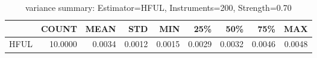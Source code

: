 \begin{table}[ht]
\centering
\caption{variance summary: Estimator=HFUL, Instruments=200, Strength=0.70}
\begin{tabular}{lrrrrrrrr}
\toprule
 & COUNT & MEAN & STD & MIN & 25\% & 50\% & 75\% & MAX \\
\midrule
HFUL & 10.0000 & 0.0034 & 0.0012 & 0.0015 & 0.0029 & 0.0032 & 0.0046 & 0.0048 \\
\bottomrule
\end{tabular}
\end{table}
